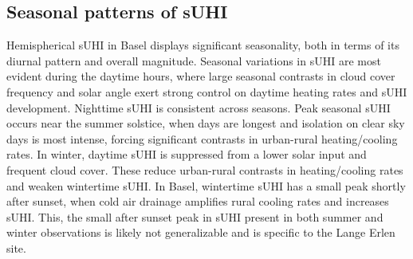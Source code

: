 \begin{bibunit}


\subsection{Seasonal patterns of sUHI}

Hemispherical sUHI in Basel displays significant seasonality, both in terms of its diurnal pattern and overall magnitude. Seasonal variations in sUHI are most evident during the daytime hours, where large seasonal contrasts in cloud cover frequency and solar angle exert strong control on daytime heating rates and sUHI development. Nighttime sUHI is consistent across seasons. Peak seasonal sUHI occurs near the summer solstice, when days are longest and isolation on clear sky days is most intense, forcing significant contrasts in urban-rural heating/cooling rates. In winter, daytime sUHI is suppressed from a lower solar input and frequent cloud cover. These reduce urban-rural contrasts in heating/cooling rates and weaken wintertime sUHI. In Basel, wintertime sUHI has a small peak shortly after sunset, when cold air drainage amplifies rural cooling rates and increases sUHI. This, the small after sunset peak in sUHI present in both summer and winter observations is likely not generalizable and is specific to the Lange Erlen site.


\end{bibunit}
